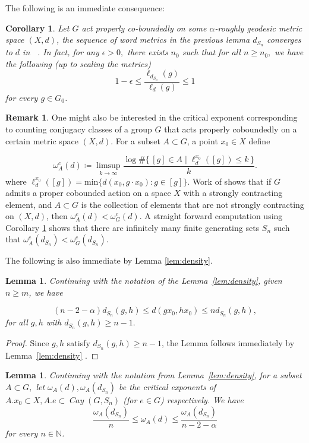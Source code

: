 \documentclass{amsart}
\numberwithin{thm}{section}
\numberwithin{figure}{section}
\newtheorem{lem}[thm]{Lemma}
\newtheorem{cor}[thm]{Corollary}
\theoremstyle{definition}
\newtheorem{remark}[thm]{Remark}
\theoremstyle{definition}
\theoremstyle{remark}
\numberwithin{equation}{section}
\DeclareMathOperator{\Cay}{\mathit{Cay}}
\DeclareMathOperator{\DDG}{\mathcal{D}(G)}
\theoremstyle{plain}
\begin{document}
The following is an immediate consequence:

\begin{cor}\label{cor:convergence} Let $G$ act properly co-boundedly on some $\alpha$-roughly geodesic metric space $(X,d)$, the sequence of word metrics in the previous lemma $d_{S_n}$ converges to $d$ in $\DDG$. In fact, for any $\epsilon>0,$ there exists $n_0$ such that for all $n \geq n_0,$ we have the following (up to scaling the metrics) 
$$1-\epsilon \leq \frac{\ell_{d_{S_n}}(g)}{\ell_{d}(g)} \leq 1$$
for every $g \in G_0$.
    
\end{cor}

\begin{remark} One might also be interested in the critical exponent corresponding to counting conjugacy classes of a group $G$ that acts properly coboundedly on a certain metric space $(X,d)$. For a subset $A \subset G$, a point $x_0 \in X$ define

\[
\omega_A^c(d)\coloneqq 
\limsup_{k\to\infty}
\frac{\log \#\{\, [g]\in A \;\big|\; \ell_d^{x_0}([g]) \le k \,\}}{k}.
\]
where $\ell_d^{x_0}([g])= \text{min}\{d(x_0, g \cdot x_0): g \in [g]\}$. Work of \cite{Gekhtman2022} shows that if $G$ admits a proper cobounded action on a space $X$ with a strongly contracting element, and $A \subset G$ is the collection of elements that are not strongly contracting on $(X,d)$, then $\omega_A^c(d)< \omega_G^c(d)$. A straight forward computation using Corollary \ref{cor:convergence} shows that there are infinitely many finite generating sets $S_n$ such that $\omega_A^c(d_{S_n})< \omega_G^c(d_{S_n})$.
\end{remark}

The following is also immediate by Lemma \ref{lem:density}.




\begin{lem} Continuing with the notation of the Lemma~\ref{lem:density}, given $n \geq m$, we have 

$$(n-2-\alpha)d_{S_n}(g,h) \leq d(gx_0,hx_0) \leq n d_{S_n}(g,h),$$ for all $g,h$ with $d_{S_n}(g,h) \geq n-1. $
\label{lem:cutoff}
\end{lem}

\begin{proof}
    Since $g,h$ satisfy $d_{S_n}(g,h) \geq n-1$, the Lemma follows immediately by Lemma~\ref{lem:density} .
\end{proof}


\begin{lem} Continuing with the notation from Lemma~\ref{lem:density}, for a subset $A \subset G,$ let $\omega_A (d), \omega_A(d_{S_n})$ be the critical exponents of $A.x_0 \subset X, A.e \subset \Cay (G,S_n)$ (for $e \in G$) respectively. We have $$\frac{\omega_A(d_{S_n})}{n} \leq \omega_A (d) \leq \frac{\omega_A(d_{S_n})}{n-2-\alpha}$$
for every $n \in \mathbb{N}$. 

    \label{lem:criticalexponents}
\end{lem}
\end{document}
